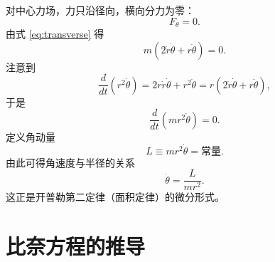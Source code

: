 \documentclass[UTF8,a4paper,11pt]{ctexart}
\begin{document}
对中心力场，力只沿径向，横向分力为零：
\begin{equation}
  F_\theta = 0 .
\end{equation}
由式 \eqref{eq:transverse} 得
\begin{equation}
  m\left(2\dot r\dot\theta + r\ddot\theta\right)=0 .
\end{equation}
注意到
\begin{equation}
  \frac{d}{dt}\left(r^{2}\dot\theta\right)
  = 2r\dot r\dot\theta + r^{2}\ddot\theta
  = r\left(2\dot r\dot\theta + r\ddot\theta\right),
\end{equation}
于是
\begin{equation}
  \frac{d}{dt}\left(m r^{2}\dot\theta\right)=0 .
\end{equation}
定义角动量
\begin{equation}
  L \equiv m r^{2}\dot\theta = \text{常量}. \label{eq:L}
\end{equation}
由此可得角速度与半径的关系
\begin{equation}
  \dot\theta = \frac{L}{m r^{2}} . \label{eq:thetadot}
\end{equation}
这正是开普勒第二定律（面积定律）的微分形式。

\section{比奈方程的推导}
\end{document}
